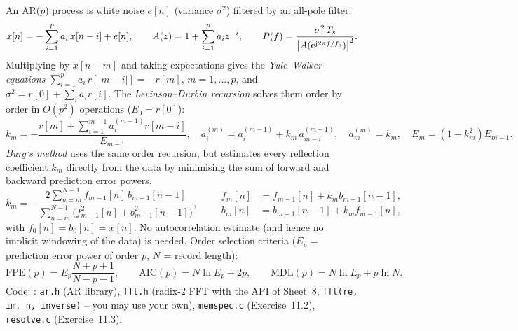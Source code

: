 An AR($p$) process is white noise $e[n]$ (variance $\sigma^2$) filtered by an all-pole
filter:
\[
  x[n]=-\sum_{i=1}^{p}a_i\,x[n-i]+e[n],\qquad
  A(z)=1+\sum_{i=1}^{p}a_iz^{-i},\qquad
  P(f)=\frac{\sigma^2\,T_s}{\bigl|A(\mathrm{e}^{\mathrm{j}2\pi f/f_s})\bigr|^2}.
\]
Multiplying by $x[n-m]$ and taking expectations gives the
\emph{Yule--Walker equations} $\sum_{i=1}^{p}a_i\,r[|m-i|]=-r[m]$, $m=1,\dots,p$, and
$\sigma^2=r[0]+\sum_i a_i r[i]$. The \emph{Levinson--Durbin recursion} solves them
order by order in $O(p^2)$ operations ($E_0=r[0]$):
\[
  k_m=-\frac{r[m]+\sum_{i=1}^{m-1}a_i^{(m-1)}r[m-i]}{E_{m-1}},\quad
  a_i^{(m)}=a_i^{(m-1)}+k_m\,a_{m-i}^{(m-1)},\quad a_m^{(m)}=k_m,\quad
  E_m=(1-k_m^2)E_{m-1}.
\]
\emph{Burg's method} uses the same order recursion, but estimates every reflection
coefficient $k_m$ directly from the data by minimising the sum of forward and backward
prediction error powers,
\[
  k_m=-\frac{2\sum_{n=m}^{N-1}f_{m-1}[n]\,b_{m-1}[n-1]}
           {\sum_{n=m}^{N-1}\bigl(f_{m-1}^2[n]+b_{m-1}^2[n-1]\bigr)},\qquad
  \begin{aligned}
  f_m[n]&=f_{m-1}[n]+k_m b_{m-1}[n-1],\\ b_m[n]&=b_{m-1}[n-1]+k_m f_{m-1}[n],
  \end{aligned}
\]
with $f_0[n]=b_0[n]=x[n]$. No autocorrelation estimate (and hence no implicit
windowing of the data) is needed. Order selection criteria ($E_p$ = prediction error
power of order $p$, $N$ = record length):
\[
  \mathrm{FPE}(p)=E_p\frac{N+p+1}{N-p-1},\qquad
  \mathrm{AIC}(p)=N\ln E_p+2p,\qquad
  \mathrm{MDL}(p)=N\ln E_p+p\ln N .
\]
Code: : \texttt{ar.h} (AR library), \texttt{fft.h}
(radix-2 FFT with the API of Sheet~8, \texttt{fft(re, im, n, inverse)} -- you may
use your own), \texttt{memspec.c} (Exercise~11.2), \texttt{resolve.c} (Exercise~11.3).

